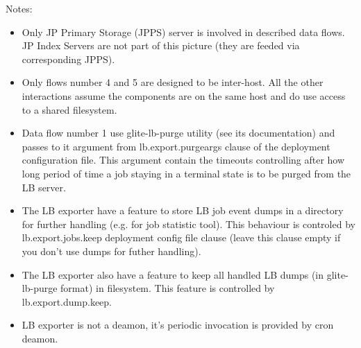 Notes:
\begin{itemize}
 \item Only JP Primary Storage (JPPS) server is involved in described
   data flows. JP Index Servers are not part of this picture (they are
   feeded via corresponding JPPS).
 \item Only flows number 4 and 5 are designed to be inter-host. All
   the other interactions assume the components are on the same host and
   do use access to a shared filesystem.
 \item Data flow number 1 use glite-lb-purge utility (see its
   documentation) and passes to it argument from lb.export.purgeargs
   clause of the deployment configuration file. This argument contain
   the timeouts controlling after how long period of time a job
   staying in a terminal state is to be purged from the LB server.
 \item The LB exporter have a feature to store LB job event dumps in a
   directory for further handling (e.g. for job statistic tool). This behaviour
   is controled by lb.export.jobs.keep deployment config file clause (leave
   this clause empty if you don't use dumps for futher handling).
 \item The LB exporter also have a feature to keep all handled LB
   dumps (in glite-lb-purge format) in filesystem. This feature is
   controlled by lb.export.dump.keep.
 \item LB exporter is not a deamon, it's periodic invocation is
   provided by cron deamon.
\end{itemize}

